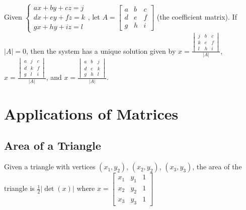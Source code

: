 \documentclass{report}
\begin{document}
Given 
$
    \begin{cases}
        ax+by+cz=j \\
        dx+ey+fz=k \\
        gx+hy+iz=l
    \end{cases}
$, let 
$
    A=
    \begin{bmatrix}
        a & b & c \\
        d & e & f \\
        g & h & i
    \end{bmatrix}
$ (the coefficient matrix). If $|A|=0$, then the system has a unique solution given by 
$
    x=\frac{
        \begin{vmatrix}
            j & b & c \\
            k & e & f \\
            l & h & i
        \end{vmatrix}
    }{|A|}
$, 
$
    x=\frac{
        \begin{vmatrix}
            a & j & c \\
            d & k & f \\
            g & l & i
        \end{vmatrix}
    }{|A|}
$, and 
$
    x=\frac{
        \begin{vmatrix}
            a & b & j \\
            d & e & k \\
            g & h & l
        \end{vmatrix}
    }{|A|}
$.

\chapter{Applications of Matrices}

\section{Area of a Triangle}

Given a triangle with vertices $(x_1,y_2)$, $(x_2,y_2)$, $(x_3,y_3)$, the area of the triangle is $\frac{1}{2}|\det(x)|$ where 
$
    x=
    \begin{bmatrix}
        x_1 & y_1 & 1 \\
        x_2 & y_2 & 1 \\
        x_3 & y_3 & 1
    \end{bmatrix}
$
\end{document}
